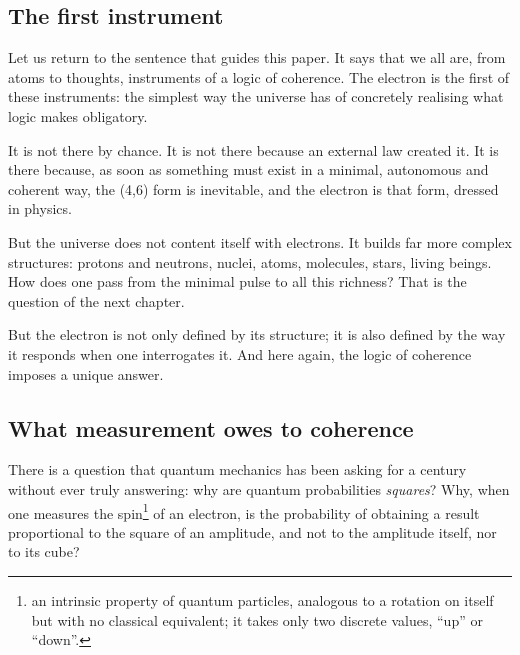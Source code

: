 \documentclass[12pt, a4paper, openright]{book}
\begin{document}
\subsection*{The first instrument}

Let us return to the sentence that guides this paper. It says that we all are, from atoms to thoughts, instruments of a logic of coherence. The electron is the first of these instruments: the simplest way the universe has of concretely realising what logic makes obligatory.

\medskip

It is not there by chance. It is not there because an external law created it. It is there because, as soon as something must exist in a minimal, autonomous and coherent way, the (4,6) form is inevitable, and the electron is that form, dressed in physics.

\medskip

But the universe does not content itself with electrons. It builds far more complex structures: protons and neutrons, nuclei, atoms, molecules, stars, living beings. How does one pass from the minimal pulse to all this richness? That is the question of the next chapter.

\medskip

But the electron is not only defined by its structure; it is also defined by the way it responds when one interrogates it. And here again, the logic of coherence imposes a unique answer.

\subsection*{What measurement owes to coherence}

There is a question that quantum mechanics has been asking for a century without ever truly answering: why are quantum probabilities \emph{squares}? Why, when one measures the spin\footnote{an intrinsic property of quantum particles, analogous to a rotation on itself but with no classical equivalent; it takes only two discrete values, “up” or “down”.} of an electron, is the probability of obtaining a result proportional to the square of an amplitude, and not to the amplitude itself, nor to its cube?

\medskip
\end{document}

